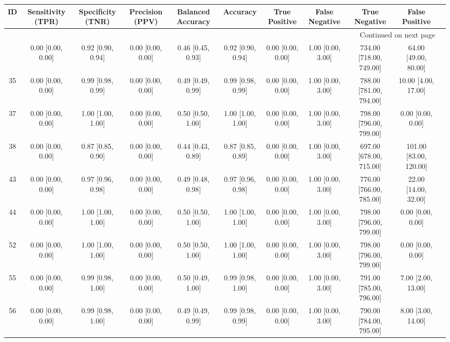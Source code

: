 \documentclass[8pt]{article}
\begin{document}
\begin{center}
\begin{footnotesize}
\begin{longtable}{|ccccccccccc|}
\toprule
 ID &  Sensitivity (TPR) &  Specificity (TNR) &    Precision (PPV) &  Balanced Accuracy &           Accuracy &      True Positive &     False Negative &            True Negative &          False Positive \\
\midrule
\endhead
\midrule
\multicolumn{10}{r}{{Continued on next page}} \\
\midrule
\endfoot

\bottomrule
\endlastfoot
 33 &  0.00 [0.00, 0.00] &  0.92 [0.90, 0.94] &  0.00 [0.00, 0.00] &  0.46 [0.45, 0.93] &  0.92 [0.90, 0.94] &  0.00 [0.00, 0.00] &  1.00 [0.00, 3.00] &  734.00 [718.00, 749.00] &    64.00 [49.00, 80.00] \\
 35 &  0.00 [0.00, 0.00] &  0.99 [0.98, 0.99] &  0.00 [0.00, 0.00] &  0.49 [0.49, 0.99] &  0.99 [0.98, 0.99] &  0.00 [0.00, 0.00] &  1.00 [0.00, 3.00] &  788.00 [781.00, 794.00] &     10.00 [4.00, 17.00] \\
 37 &  0.00 [0.00, 0.00] &  1.00 [1.00, 1.00] &  0.00 [0.00, 0.00] &  0.50 [0.50, 1.00] &  1.00 [1.00, 1.00] &  0.00 [0.00, 0.00] &  1.00 [0.00, 3.00] &  798.00 [796.00, 799.00] &       0.00 [0.00, 0.00] \\
 38 &  0.00 [0.00, 0.00] &  0.87 [0.85, 0.90] &  0.00 [0.00, 0.00] &  0.44 [0.43, 0.89] &  0.87 [0.85, 0.89] &  0.00 [0.00, 0.00] &  1.00 [0.00, 3.00] &  697.00 [678.00, 715.00] &  101.00 [83.00, 120.00] \\
 43 &  0.00 [0.00, 0.00] &  0.97 [0.96, 0.98] &  0.00 [0.00, 0.00] &  0.49 [0.48, 0.98] &  0.97 [0.96, 0.98] &  0.00 [0.00, 0.00] &  1.00 [0.00, 3.00] &  776.00 [766.00, 785.00] &    22.00 [14.00, 32.00] \\
 44 &  0.00 [0.00, 0.00] &  1.00 [1.00, 1.00] &  0.00 [0.00, 0.00] &  0.50 [0.50, 1.00] &  1.00 [1.00, 1.00] &  0.00 [0.00, 0.00] &  1.00 [0.00, 3.00] &  798.00 [796.00, 799.00] &       0.00 [0.00, 0.00] \\
 52 &  0.00 [0.00, 0.00] &  1.00 [1.00, 1.00] &  0.00 [0.00, 0.00] &  0.50 [0.50, 1.00] &  1.00 [1.00, 1.00] &  0.00 [0.00, 0.00] &  1.00 [0.00, 3.00] &  798.00 [796.00, 799.00] &       0.00 [0.00, 0.00] \\
 55 &  0.00 [0.00, 0.00] &  0.99 [0.98, 1.00] &  0.00 [0.00, 0.00] &  0.50 [0.49, 1.00] &  0.99 [0.98, 1.00] &  0.00 [0.00, 0.00] &  1.00 [0.00, 3.00] &  791.00 [785.00, 796.00] &      7.00 [2.00, 13.00] \\
 56 &  0.00 [0.00, 0.00] &  0.99 [0.98, 1.00] &  0.00 [0.00, 0.00] &  0.49 [0.49, 0.99] &  0.99 [0.98, 0.99] &  0.00 [0.00, 0.00] &  1.00 [0.00, 3.00] &  790.00 [784.00, 795.00] &      8.00 [3.00, 14.00] \\
\end{longtable}
\end{footnotesize}
\end{center}
\end{document}
